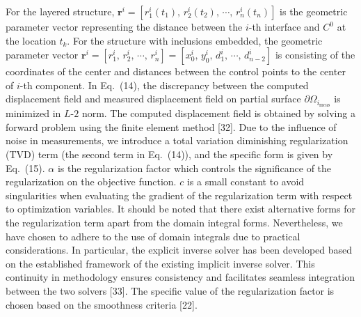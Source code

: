 \documentclass[11pt]{article}
\begin{document}
\noindent
For the layered structure,
$\mathbf{r}^i = \left[r^i_1(t_1),\, r^i_2(t_2),\, \cdots,\, r^i_n(t_n)\right]$
is the geometric parameter vector representing the distance between
the $i$-th interface and $C^0$ at the location $t_k$. For the
structure with inclusions embedded, the geometric parameter vector
$\mathbf{r}^i = \left[r^i_1,\, r^i_2,\, \cdots,\, r^i_n\right]
= \left[x^i_0,\, y^i_0,\, d^i_1,\, \cdots,\, d^i_{n-2}\right]$
is consisting of the coordinates of the center and distances between
the control points to the center of $i$-th component. In Eq.~(14),
the discrepancy between the computed displacement field and measured
displacement field on partial surface $\partial\Omega_{i_{\text{meas}}}$
is minimized in $L$-$2$ norm. The computed displacement field is
obtained by solving a forward problem using the finite element method
[32]. Due to the influence of noise in measurements, we introduce a
total variation diminishing regularization (TVD) term (the second
term in Eq.~(14)), and the specific form is given by Eq.~(15).
$\alpha$ is the regularization factor which controls the significance
of the regularization on the objective function. $c$ is a small
constant to avoid singularities when evaluating the gradient of the
regularization term with respect to optimization variables. It should
be noted that there exist alternative forms for the regularization
term apart from the domain integral forms. Nevertheless, we have
chosen to adhere to the use of domain integrals due to practical
considerations. In particular, the explicit inverse solver has been
developed based on the established framework of the existing
implicit inverse solver. This continuity in methodology ensures
consistency and facilitates seamless integration between the two
solvers [33]. The specific value of the regularization factor is
chosen based on the smoothness criteria [22].

\newpage

\setcounter{equation}{15}
\end{document}
